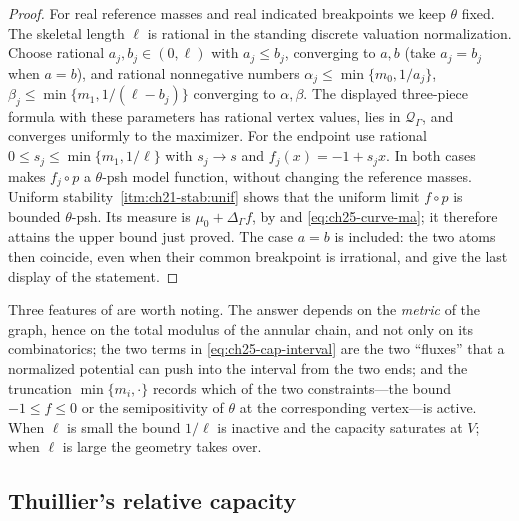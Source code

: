 \begin{proof}
For real reference masses and real indicated breakpoints we keep
$\theta$ fixed.  The skeletal length $\ell$ is rational in the standing
discrete valuation normalization.  Choose rational
$a_j,b_j\in(0,\ell)$ with $a_j\leq b_j$, converging to $a,b$
(take $a_j=b_j$ when $a=b$), and rational nonnegative numbers
$\alpha_j\leq\min\{m_0,1/a_j\}$,
$\beta_j\leq\min\{m_1,1/(\ell-b_j)\}$ converging to
$\alpha,\beta$.  The displayed three-piece formula with these parameters
has rational vertex values, lies in $\mathcal Q_\Gamma$, and converges
uniformly to the maximizer.  For the endpoint use rational
$0\leq s_j\leq\min\{m_1,1/\ell\}$ with $s_j\to s$ and
$f_j(x)=-1+s_jx$.  In both cases
 makes $f_j\circ p$ a
$\theta$-psh model function, without changing the reference masses.
Uniform stability
\,\cref{itm:ch21-stab:unif} shows that the uniform
limit $f\circ p$ is bounded $\theta$-psh.  Its measure is
$\mu_0+\Delta_\Gamma f$, by
 and \eqref{eq:ch25-curve-ma}; it therefore
attains the upper bound just proved.  The case $a=b$ is included: the two
atoms then coincide, even when their common breakpoint is irrational, and
give the last display of the statement.
\end{proof}

\begin{remark}
\label{rem:ch25-segment-reading}
Three features of  are worth noting.  The
answer depends on the \emph{metric} of the graph, hence on the total modulus
of the annular chain, and not only on its combinatorics; the two terms in
\eqref{eq:ch25-cap-interval} are the two ``fluxes'' that a normalized
potential can push into the interval from the two ends; and the truncation
$\min\{m_i,\cdot\}$ records which of the two constraints---the bound
$-1\leq f\leq0$ or the semipositivity of $\theta$ at the corresponding
vertex---is active.  When $\ell$ is small the bound $1/\ell$ is inactive
and the capacity saturates at $V$; when $\ell$ is large the geometry
takes over.
\end{remark}

\subsection{Thuillier's relative capacity}
\label{sec:ch25-thuillier}

